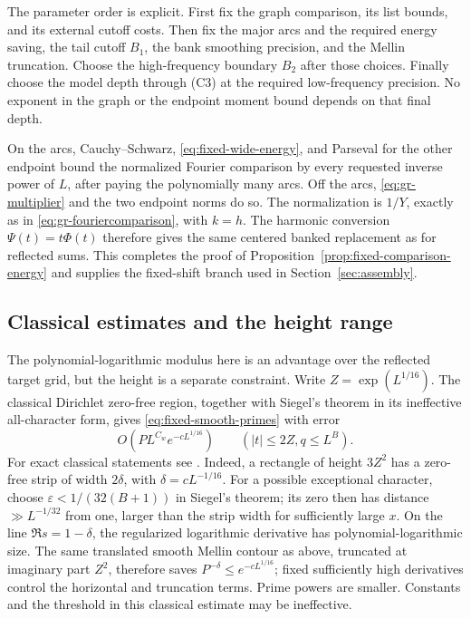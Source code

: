 The parameter order is explicit. First fix the graph comparison,
its list bounds, and its external cutoff costs. Then fix the major
arcs and the required energy saving, the tail cutoff \(B_1\),
the bank smoothing precision, and the Mellin truncation. Choose
the high-frequency boundary \(B_2\) after those choices. Finally
choose the model depth through \textup{(C3)} at the required
low-frequency precision. No exponent in the graph or the endpoint
moment bound depends on that final depth.

On the arcs, Cauchy--Schwarz, \eqref{eq:fixed-wide-energy}, and
Parseval for the other endpoint bound the normalized Fourier
comparison by every requested inverse power of \(L\), after
paying the polynomially many arcs. Off the arcs,
\eqref{eq:gr-multiplier} and the two endpoint norms do so.
The normalization is \(1/Y\), exactly as in
\eqref{eq:gr-fouriercomparison}, with \(k=h\).
The harmonic conversion \(\Psi(t)=t\Phi(t)\) therefore gives
the same centered banked replacement as for reflected sums.
This completes the proof of
Proposition~\ref{prop:fixed-comparison-energy} and supplies the
fixed-shift branch used in Section~\ref{sec:assembly}.

\subsection{Classical estimates and the height range}\label{sec:fixed-classical-boundary}

The polynomial-logarithmic modulus here is an advantage over the
reflected target grid, but the height is a separate constraint.
Write \(Z=\exp(L^{1/16})\). The classical Dirichlet zero-free
region, together with Siegel's theorem in its ineffective all-character
form, gives \eqref{eq:fixed-smooth-primes} with error
\[
          O\!\left(P L^{C_w}e^{-cL^{1/16}}\right)
                      \qquad(|t|\le 2Z, q\le L^B).
\]
For exact classical statements see \cite[Proposition 51,
Theorem 62(ii) and Exercise 45(i)--(ii)]{taonotes}.
Indeed, a rectangle of height \(3Z^2\) has a zero-free strip of
width \(2\delta\), with \(\delta=cL^{-1/16}\).
For a possible exceptional character, choose
\(\varepsilon<1/(32(B+1))\) in Siegel's theorem; its zero then
has distance \(\gg L^{-1/32}\) from one, larger than the strip
width for sufficiently large \(x\). On the line
\(\Re s=1-\delta\), the regularized logarithmic derivative
has polynomial-logarithmic size. The same translated smooth Mellin
contour as above, truncated at imaginary part \(Z^2\), therefore
saves \(P^{-\delta}\le e^{-cL^{1/16}}\); fixed sufficiently high
derivatives control the horizontal and truncation terms. Prime powers
are smaller. Constants and the threshold in this classical estimate
may be ineffective.

